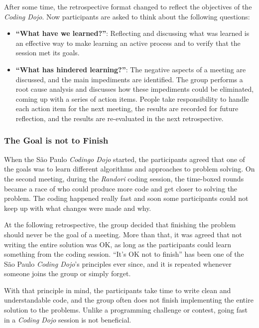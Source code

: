 After some time, the retrospective format changed to reflect the
objectives of the \emph{Coding Dojo}. Now participants are asked to
think about the following questions:

\begin{itemize}
\item \textbf{``What have we learned?''}: Reflecting and discussing
  what was learned is an effective way to make learning an active
  process and to verify that the session met its goals.
\item \textbf{``What has hindered learning?''}: The negative aspects
  of a meeting are discussed, and the main impediments are
  identified. The group performs a root cause analysis and discusses
	how these impediments could be eliminated, coming up
	with a series of action items. People take responsibility
  to handle each action item for the next meeting, the results are
	recorded for future reflection, and the results are re-evaluated in
	the next retrospective.
\end{itemize}

\subsubsection{The Goal is not to Finish}

When the São Paulo \emph{Codingo Dojo} started, the participants
agreed that one of the goals was to learn different algorithms and
approaches to problem solving. On the second meeting, during the
\emph{Randori} coding session, the time-boxed rounds became a race
of who could produce more code and get closer to solving the
problem. The coding happened really fast and soon some participants
could not keep up with what changes were made and why.

At the following retrospective, the group decided that finishing the
problem should never be the goal of a meeting. More than that, it was
agreed that not writing the entire solution was OK, as long as the
participants could learn something from the coding session. ``It's OK
not to finish'' has been one of the São Paulo \emph{Coding Dojo}'s
principles ever since, and it is repeated whenever someone joins the
group or simply forget.

With that principle in mind, the participants take time to write clean and
understandable code, and the group often does not finish implementing the
entire solution to the problems. Unlike a programming challenge or contest,
going fast in a \emph{Coding Dojo} session is not beneficial.

